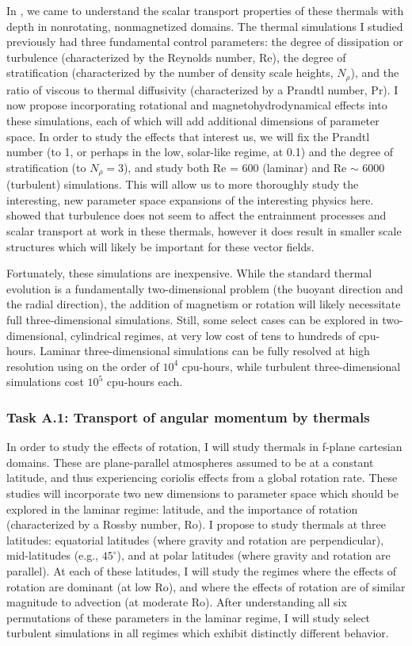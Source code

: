 \documentclass[aasms,12pt]{article}
\begin{document}
In \citet{andersLB2019}, we came to understand the scalar transport properties of these thermals with depth in nonrotating, nonmagnetized domains.
The thermal simulations I studied previously had three fundamental control parameters: the degree of dissipation or turbulence (characterized by the Reynolds number, Re), the degree of stratification (characterized by the number of density scale heights, $N_\rho$), and the ratio of viscous to thermal diffusivity (characterized by a Prandtl number, Pr).
I now propose incorporating rotational and magnetohydrodynamical effects into these simulations, each of which will add additional dimensions of parameter space.
In order to study the effects that interest us, we will fix the Prandtl number (to 1, or perhaps in the low, solar-like regime, at 0.1) and the degree of stratification (to $N_\rho = 3$), and study both Re = 600 (laminar) and Re $\sim$ 6000 (turbulent) simulations.
This will allow us to more thoroughly study the interesting, new parameter space expansions of the interesting physics here.
\citet{lecoanet&jeevanjee2019} showed that turbulence does not seem to affect the entrainment processes and scalar transport at work in these thermals, however it does result in smaller scale structures which will likely be important for these vector fields.

Fortunately, these simulations are inexpensive.
While the standard thermal evolution is a fundamentally two-dimensional problem (the buoyant direction and the radial direction), the addition of magnetism or rotation will likely necessitate full three-dimensional simulations.
Still, some select cases can be explored in two-dimensional, cylindrical regimes, at very low cost of tens to hundreds of cpu-hours.
Laminar three-dimensional simulations can be fully resolved at high resolution using on the order of $10^4$ cpu-hours, while turbulent three-dimensional simulations cost $10^5$ cpu-hours each.

\subsubsection{Task A.1: Transport of angular momentum by thermals}
In order to study the effects of rotation, I will study thermals in f-plane cartesian domains.
These are plane-parallel atmospheres assumed to be at a constant latitude, and thus experiencing coriolis effects from a global rotation rate.
These studies will incorporate two new dimensions to parameter space which should be explored in the laminar regime: latitude, and the importance of rotation (characterized by a Rossby number, Ro).
I propose to study thermals at three latitudes: equatorial latitudes (where gravity and rotation are perpendicular), mid-latitudes (e.g., $45^\circ$), and at polar latitudes (where gravity and rotation are parallel).
At each of these latitudes, I will study the regimes where the effects of rotation are dominant (at low Ro), and where the effects of rotation are of similar magnitude to advection (at moderate Ro).
After understanding all six permutations of these parameters in the laminar regime, I will study select turbulent simulations in all regimes which exhibit distinctly different behavior.
\end{document}
